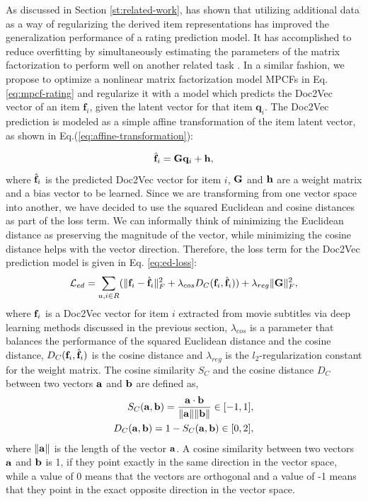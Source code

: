 As discussed in Section \ref{st:related-work}, \cite{Almahairi2015} has shown that utilizing additional data as a way of regularizing the derived item representations has improved the generalization performance of a rating prediction model.
It has accomplished to reduce overfitting by simultaneously estimating the parameters of the matrix factorization to perform well on another related task \cite{Almahairi2015}.
In a similar fashion, we propose to optimize a nonlinear matrix factorization model MPCFs in Eq. \ref{eq:mpcf-rating} and regularize it with a model which predicts the Doc2Vec vector of an item $\mathbf{f}_i$, given the latent vector for that item $\mathbf{q}_i$.
The Doc2Vec prediction is modeled as a simple affine transformation of the item latent vector, as shown in Eq.(\ref{eq:affine-transformation}):

\begin{equation}
\hat{\mathbf{f}}_{i} = \mathbf{G} \mathbf{q}_i + \mathbf{h} \label{eq:affine-transformation},
\end{equation}
where $\hat{\mathbf{f}}_i$ is the predicted Doc2Vec vector for item $i$, $\mathbf{G}$ and $\mathbf{h}$ are a weight matrix and a bias vector to be learned.
Since we are transforming from one vector space into another, we have decided to use the squared Euclidean and cosine distances as part of the loss term.
We can informally think of minimizing the Euclidean distance as preserving the magnitude of the vector, while minimizing the cosine distance helps with the vector direction. 
Therefore, the loss term for the Doc2Vec prediction model is given in Eq. \ref{eq:ed-loss}:
\begin{equation}
\mathcal{L}_{ed} = \sum_{u,i \in R} (\lVert{\ensuremath{\mathbf{f}}_i - \hat{\ensuremath{\mathbf{f}}}_i}\rVert_F^2 + \lambda_{cos} D_C(\mathbf{f}_i, \hat{\mathbf{f}}_i)) + \lambda_{reg} \lVert{\ensuremath{\mathbf{G}}}\rVert_F^2  \label{eq:ed-loss},
\end{equation}
where $\mathbf{f}_i$ is a Doc2Vec vector for item $i$ extracted from movie subtitles via deep learning methods discussed in the previous section, $\lambda_{cos}$ is a parameter that balances the performance of the squared Euclidean distance and the cosine distance, $D_C(\mathbf{f}_i, \hat{\mathbf{f}}_i)$ is the cosine distance and $\lambda_{reg}$ is the $l_2$-regularization constant for the weight matrix.
The cosine similarity $S_C$ and the cosine distance $D_C$ between two vectors $\mathbf{a}$ and $\mathbf{b}$ are defined as,
\begin{align}
	S_C(\mathbf{a}, \mathbf{b}) = \frac{\mathbf{a} \cdot \mathbf{b}}{\lVert{\ensuremath{\mathbf{a}}}\rVert \lVert{\ensuremath{\mathbf{b}}}\rVert} \in [-1, 1], \label{eq:cosine-sim}\\
	D_C(\mathbf{a}, \mathbf{b}) = 1 - S_C(\mathbf{a}, \mathbf{b}) \in [0, 2],
\end{align}
where $\lVert{\ensuremath{\mathbf{a}}}\rVert$ is the length of the vector $\mathbf{a}$.
A cosine similarity between two vectors $\mathbf{a}$ and $\mathbf{b}$ is 1, if they point exactly in the same direction in the vector space, while a value of 0 means that the vectors are orthogonal and a value of -1 means that they point in the exact opposite direction in the vector space.

